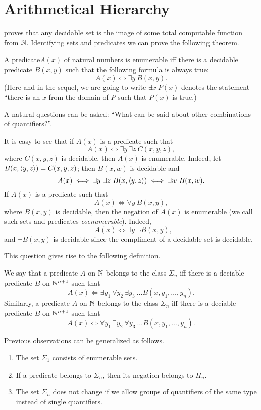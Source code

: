 \chapter{Arithmetical Hierarchy}

 proves that any decidable set
is the image of some total computable function from ${\mathbb{N}}$. Identifying sets and
predicates we can prove the following theorem.
\begin{theorem}
  A predicate$A(x)$ of natural numbers is enumerable iff there is a decidable
  predicate $B(x, y)$ such that the following formula is always true:
  \[
    A(x) \iff \exists y \  B(x, y).
  \]
  (Here and in the sequel, we are going to write $\exists x \  P(x)$ denotes the
  statement ``there is an $x$ from the domain of $P$ such that $P(x)$ is true.)
\end{theorem}

A natural questions can be asked: ``What can be said about other combinations of
quantifiers?''.

It is easy to see that if $A(x)$ is a predicate such that 
\[
  A(x) \iff \exists y \  \exists z \  C(x, y, z),
\]
where $C(x, y, z)$ is decidable, then $A(x)$ is enumerable.
Indeed, let $B(x, \langle {y}, {z} \rangle) = C(x, y, z)$; then $B(x, w)$ is decidable and 
\[
  A(x) \iff \exists y \  \exists z \  B(x, \langle {y}, {z} \rangle) \iff 
    \exists w \  B(x, w).
\]
If $A(x)$ is a predicate such that 
\[
  A(x) \iff \forall y \  B(x, y),
\]
where $B(x, y)$ is decidable, then the negation of $A(x)$ is enumerable (we call
such sets and predicates \emph{coenumerable}). Indeed, 
\[
  \lnot A(x) \iff \exists y \  \lnot B(x, y),
\]
and $\lnot B(x, y)$ is decidable since the compliment of a decidable set is
decidable.

This question gives rise to the following definition.
\begin{definition}
  We say that a predicate $A$ on ${\mathbb{N}}$ belongs to the class $\Sigma_n$ iff there
  is a deciable predicate $B$ on ${\mathbb{N}}^{n + 1}$ such that 
  \[
    A(x) \iff 
    \exists y_1 \  \forall y_2 \  \exists y_3 \  \dots B(x, y_1, \dots, y_n).
  \]
  Similarly, a predicate $A$ on ${\mathbb{N}}$ belongs to the class $\Sigma_n$ iff there
  is a deciable predicate $B$ on ${\mathbb{N}}^{n + 1}$ such that 
  \[
    A(x) \iff 
    \forall y_1 \  \exists y_2 \  \forall y_3 \  \dots B(x, y_1, \dots, y_n).
  \]
\end{definition}

Previous observations can be generalized as follows.
\begin{theorem}
  \begin{enumerate}
    \item The set $\Sigma_1$ consists of enumerable sets.
    \item If a predicate belongs to $\Sigma_n$, then its negation belongs to
      $\Pi_n$.
    \item The set $\Sigma_n$ does not change if we allow groups of quantifiers
      of the same type instead of single quantifiers.
  \end{enumerate}
\end{theorem}

